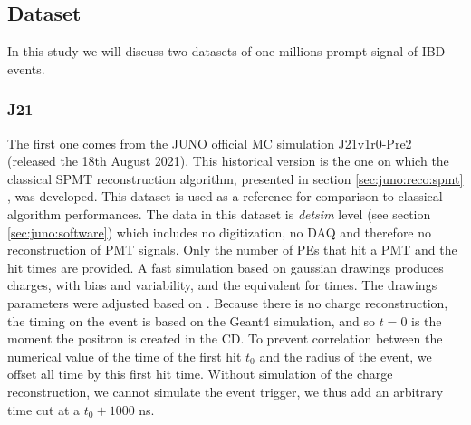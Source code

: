 \documentclass[../main.tex]{subfiles}
\begin{document}
\subsection{Dataset}


In this study we will discuss two datasets of one millions prompt signal of IBD events.

\subsubsection{J21}

The first one comes from the JUNO official MC simulation J21v1r0-Pre2 (released the 18th August 2021). This historical version is the one on which the classical SPMT reconstruction algorithm, presented in section \ref{sec:juno:reco:spmt} \cite{lebrin_towards_2022}, was developed. This dataset is used as a reference for comparison to classical algorithm performances.
The data in this dataset is \textit{detsim} level (see section \ref{sec:juno:software})  which includes no digitization, no DAQ  and therefore no reconstruction of PMT signals. Only the number of PEs that hit a PMT and the hit times are provided. A fast simulation based on gaussian drawings produces charges, with bias and variability, and the equivalent for times. The drawings parameters were adjusted based on  \cite{cao_mass_2021, abusleme_mass_2022}.
Because there is no charge reconstruction, the timing on the event is based on the Geant4 simulation, and so $t=0$ is the moment the positron is created in the CD. To prevent correlation between the numerical value of the time of the first hit $t_0$ and the radius of the event, we offset all time by this first hit time. Without simulation of the charge reconstruction, we cannot simulate the event trigger, we thus add an arbitrary time cut at a $t_0 + 1000$ ns.
\end{document}
